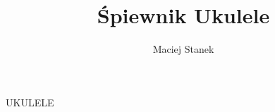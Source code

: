 \documentclass[twoside]{article}
\author{Maciej Stanek}
\title{Śpiewnik Ukulele}
\begin{document}

UKULELE
\end{document}
